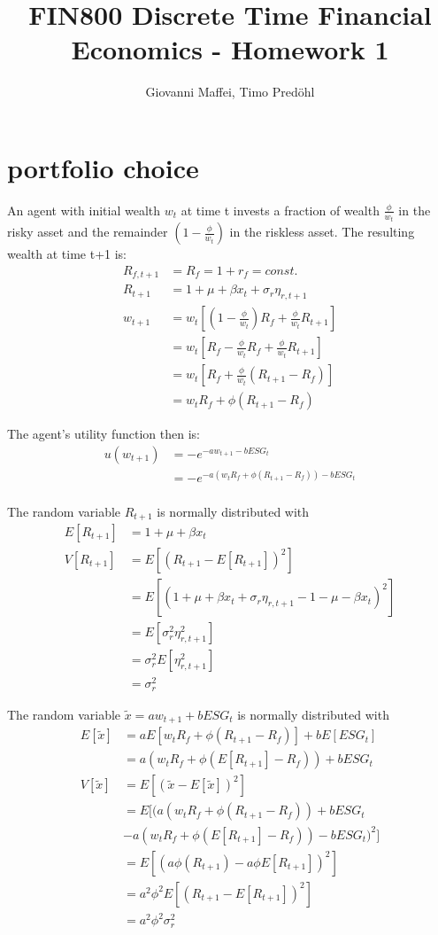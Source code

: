 \documentclass[]{article}
\title{FIN800 Discrete Time Financial Economics - Homework 1}
\author{Giovanni Maffei, Timo Predöhl}
\begin{document}
\maketitle

\section{portfolio choice}
An agent with initial wealth $w_t$ at time t invests a fraction of wealth $\frac{\phi}{w_t}$ in the risky asset and the remainder $(1-\frac{\phi}{w_t})$ in the riskless asset. The resulting wealth at time t+1 is:
\begin{align*}
	R_{f,t+1} &= R_{f} = 1+r_f = const.\\
	R_{t+1} &= 1 + \mu + \beta x_t + \sigma_r \eta_{r, t+1}\\
	w_{t+1} &= w_t[(1-\frac{\phi}{w_t})R_f+\frac{\phi}{w_t} R_{t+1}]\\
	&= w_t[R_f - \frac{\phi}{w_t} R_f + \frac{\phi}{w_t} R_{t+1}]\\
	&= w_t[R_f + \frac{\phi}{w_t} (R_{t+1} - R_f)]\\
	&= w_t R_f + \phi (R_{t+1} - R_f)
\end{align*}

The agent's utility function then is:
\begin{align*}
	u(w_{t+1}) &= -e^{-aw_{t+1} - bESG_t}\\
	&= -e^{-a(w_t R_f + \phi (R_{t+1} - R_f)) - bESG_t}\\
\end{align*}

The random variable $R_{t+1}$ is normally distributed with 
\begin{align*}
	E[R_{t+1}] &= 1+\mu+\beta x_t\\
	V[R_{t+1}] &= E[(R_{t+1} - E[R_{t+1}])^2]\\
	&= E[(1 + \mu + \beta x_t + \sigma_r \eta_{r, t+1} - 1 - \mu - \beta x_t)^2]\\
	&= E[\sigma_r^2 \eta_{r, t+1}^2]\\
	&= \sigma_r^2 E[\eta_{r, t+1}^2]\\
	&= \sigma_r^2
\end{align*}

The random variable $\tilde{x} = aw_{t+1} + bESG_t$ is normally distributed with 
\begin{align*}
	E[\tilde{x}] &= aE[w_t R_f + \phi (R_{t+1} - R_f)] + bE[ESG_t]\\
	&= a(w_t R_f + \phi (E[R_{t+1}] - R_f)) + bESG_t\\
	V[\tilde{x}] &= E[(\tilde{x} - E[\tilde{x}])^2]\\
	&= E[(a(w_t R_f + \phi (R_{t+1} - R_f)) + bESG_t \\
	&- a(w_t R_f + \phi (E[R_{t+1}] - R_f)) - bESG_t)^2]\\
	&= E[(a\phi (R_{t+1}) - a \phi E[R_{t+1}])^2]\\
	&= a^2 \phi^2 E[(R_{t+1} - E[R_{t+1}])^2]\\
	&= a^2 \phi^2 \sigma_r^2\\
\end{align*}
\end{document}
